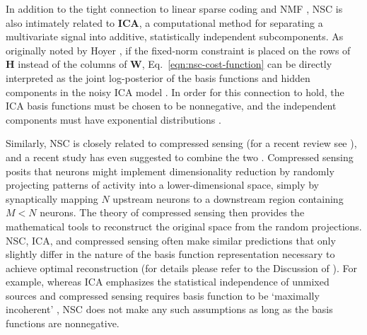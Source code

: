 In addition to the tight connection 
to linear sparse coding and \ac{NMF}
\cite{EggertKorner2004},
\ac{NSC} is also intimately related to \textbf{\ac{ICA}},
a computational method for separating a multivariate signal
into additive, statistically independent subcomponents. 
As originally noted by Hoyer \cite{Hoyer2002},
if the fixed-norm constraint is placed on the rows of
\textbf{H} instead of the columns of \textbf{W},
Eq.~\ref{eqn:nsc-cost-function} can be directly interpreted as the joint
log-posterior of the basis functions and hidden components
in the noisy \ac{ICA} model \cite{HoyerHyvarinen2002}.
In order for this connection to hold,
the \ac{ICA} basis functions must be chosen to be nonnegative,
and the independent components must have 
exponential distributions \cite{Hoyer2002}.

Similarly, \ac{NSC} is closely related to compressed sensing
(for a recent review see \cite{GanguliSompolinsky2012}),
and a recent study has even suggested to combine the two
\cite{WangLi2010}.
Compressed sensing posits that neurons might implement 
dimensionality reduction by randomly projecting patterns of activity
into a lower-dimensional space,
simply by synaptically mapping $N$ upstream neurons to a downstream region
containing $M < N$ neurons.
The theory of compressed sensing then provides the mathematical tools
to reconstruct the original space from the random projections.
\ac{NSC}, \ac{ICA}, and compressed sensing often make similar predictions
that only slightly differ in the nature of the basis function representation
necessary to achieve optimal reconstruction
(for details please refer to the Discussion of \cite{GanguliSompolinsky2012}).
For example, whereas \ac{ICA} emphasizes the statistical independence 
of unmixed sources
and compressed sensing requires basis function to be `maximally incoherent'
\cite{GanguliSompolinsky2012},
\ac{NSC} does not make any such assumptions
as long as the basis functions are nonnegative.

